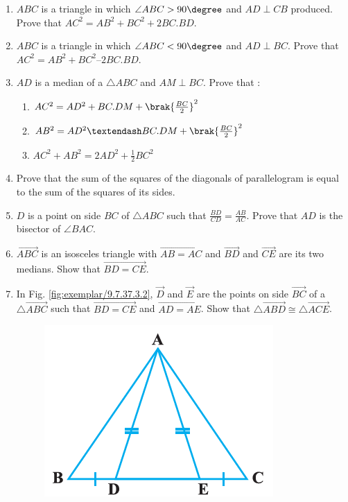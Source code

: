 \begin{enumerate}[label=\arabic*.,ref=\thesubsection.\theenumi]
\item  $ABC$ is a triangle in which  $\angle  ABC > 90\degree$ and $AD  \perp  CB$ produced. Prove that
$ AC^2= AB^2 + BC^2 + 2 BC . BD$.
\item $ABC$ is a triangle in which  $\angle  ABC < 90\degree$ and $AD  \perp  BC$. Prove that $AC^2= AB^2 + BC^2 – 2 BC . BD$.
\item $AD$ is a median of a $\triangle ABC$ and $AM  \perp  BC$. Prove that :
\begin{enumerate}
\item  $AC^2 = AD^2 + BC . DM +
\brak{\frac{BC}{ 2}}^2$
\item  $AB^2 = AD^2 – BC . DM + \brak{\frac{BC}{ 2}}^
2 $
\item  $AC^2 + AB^2 = 2 AD^2 + \frac{1}{ 2} BC^2$
\end{enumerate}
\item Prove that the sum of the squares of the diagonals of parallelogram is equal to the sum of the squares of its sides.
\item   $D$ is a point on side $BC$ of  $\triangle  ABC$ such that
$\frac{BD}{CD}= \frac{AB}{AC}  $.  Prove that $AD$ is the bisector of  $\angle  BAC$.
	\item $\vec{ABC}$ is an isosceles triangle with $\vec{AB=AC}$ and $\vec{BD}$ and $\vec{CE}$ are its two medians. Show that $\vec{BD=CE}$.
	\item In Fig. \ref{fig:exemplar/9.7.37.3.2}, $\vec{D}$ and $\vec{E}$ are the points on side $\vec{BC}$ of a $\triangle \vec{ABC}$ such that $\vec{BD=CE}$ and $\vec{AD=AE}$. Show that $\triangle \vec{ABD} \cong \triangle \vec{ACE}$.
\begin{figure}[h]
	\centering
	\includegraphics[width=\columnwidth]{chapters/exemplar/9.7.3/figs/Figure1.png}

\end{figure}
\end{enumerate}

